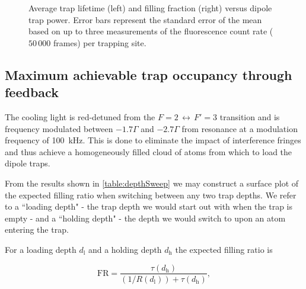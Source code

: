 \documentclass[../Thesis-IJspeert.tex]{subfiles}
\begin{document}
\begin{figure}[!t]
	\caption[An example of a floating figure]{Average trap lifetime (left) and filling fraction (right) versus dipole trap power. Error bars represent the standard error of the mean based on up to three measurements of the fluorescence count rate ($50\,000$ frames) per trapping site.} %
	\label{fig:LTandFR} 
\end{figure}





\subsection{Maximum achievable trap occupancy through feedback}
The cooling light is red-detuned from the $F=2 \, \leftrightarrow \, F'=3$ transition and is frequency modulated between $-1.7\Gamma$ and $-2.7\Gamma$ from resonance at a modulation frequency of \SI{100}{\kHz}. This is done to eliminate the impact of interference fringes and thus achieve a homogeneously filled cloud of atoms from which to load the dipole traps.

From the results shown in \cref{table:depthSweep} we may construct a surface plot of the expected filling ratio when switching between any two trap depths. We refer to a ``loading depth" - the trap depth we would start out with when the trap is empty - and a ``holding depth" - the depth we would switch to upon an atom entering the trap. 

For a loading depth $d_\mathrm{l}$ and a holding depth $d_\mathrm{h}$ the expected filling ratio is



\begin{equation}
	\mathrm{FR} = \frac{\tau(d_\mathrm{h})}{(1/R(d_\mathrm{l})) + \tau(d_\mathrm{h})},
\end{equation}
\end{document}
